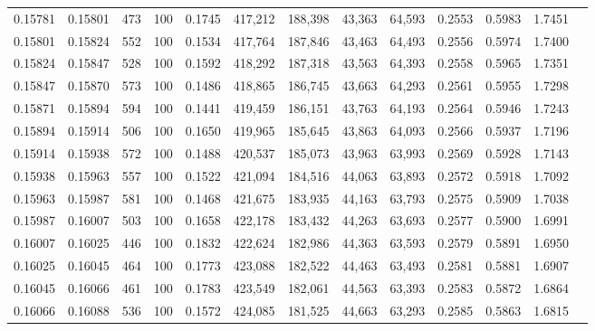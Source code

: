 \begin{tabular}{rrrrrrrrrrrrr}
0.15781 & 0.15801 &   473 & 100 &                                     0.1745 & 417,212 & 188,398 &  43,363 &  64,593 & 0.2553 & 0.5983 & 1.7451 \\
0.15801 & 0.15824 &   552 & 100 &                                     0.1534 & 417,764 & 187,846 &  43,463 &  64,493 & 0.2556 & 0.5974 & 1.7400 \\
0.15824 & 0.15847 &   528 & 100 &                                     0.1592 & 418,292 & 187,318 &  43,563 &  64,393 & 0.2558 & 0.5965 & 1.7351 \\
0.15847 & 0.15870 &   573 & 100 &                                     0.1486 & 418,865 & 186,745 &  43,663 &  64,293 & 0.2561 & 0.5955 & 1.7298 \\
0.15871 & 0.15894 &   594 & 100 &                                     0.1441 & 419,459 & 186,151 &  43,763 &  64,193 & 0.2564 & 0.5946 & 1.7243 \\
0.15894 & 0.15914 &   506 & 100 &                                     0.1650 & 419,965 & 185,645 &  43,863 &  64,093 & 0.2566 & 0.5937 & 1.7196 \\
0.15914 & 0.15938 &   572 & 100 &                                     0.1488 & 420,537 & 185,073 &  43,963 &  63,993 & 0.2569 & 0.5928 & 1.7143 \\
0.15938 & 0.15963 &   557 & 100 &                                     0.1522 & 421,094 & 184,516 &  44,063 &  63,893 & 0.2572 & 0.5918 & 1.7092 \\
0.15963 & 0.15987 &   581 & 100 &                                     0.1468 & 421,675 & 183,935 &  44,163 &  63,793 & 0.2575 & 0.5909 & 1.7038 \\
0.15987 & 0.16007 &   503 & 100 &                                     0.1658 & 422,178 & 183,432 &  44,263 &  63,693 & 0.2577 & 0.5900 & 1.6991 \\
0.16007 & 0.16025 &   446 & 100 &                                     0.1832 & 422,624 & 182,986 &  44,363 &  63,593 & 0.2579 & 0.5891 & 1.6950 \\
0.16025 & 0.16045 &   464 & 100 &                                     0.1773 & 423,088 & 182,522 &  44,463 &  63,493 & 0.2581 & 0.5881 & 1.6907 \\
0.16045 & 0.16066 &   461 & 100 &                                     0.1783 & 423,549 & 182,061 &  44,563 &  63,393 & 0.2583 & 0.5872 & 1.6864 \\
0.16066 & 0.16088 &   536 & 100 &                                     0.1572 & 424,085 & 181,525 &  44,663 &  63,293 & 0.2585 & 0.5863 & 1.6815 \\

\end{tabular}
